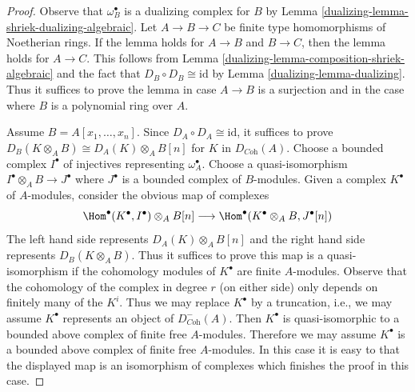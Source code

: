 \begin{proof}

Observe that $\omega_B^\bullet$ is a dualizing complex for $B$ by
Lemma \ref{dualizing-lemma-shriek-dualizing-algebraic}.
Let $A \to B \to C$ be finite type homomorphisms of Noetherian rings.
If the lemma holds for $A \to B$ and $B \to C$, then the lemma holds for
$A \to C$. This follows from
Lemma \ref{dualizing-lemma-composition-shriek-algebraic}
and the fact that $D_B \circ D_B \cong \text{id}$ by
Lemma \ref{dualizing-lemma-dualizing}.
Thus it suffices to prove the lemma in case $A \to B$ is
a surjection and in the case where $B$ is a
polynomial ring over $A$.

\medskip\noindent
Assume $B = A[x_1, \ldots, x_n]$. Since $D_A \circ D_A \cong \text{id}$,
it suffices to prove
$D_B(K \otimes_A B) \cong D_A(K) \otimes_A B[n]$ for $K$
in $D_{\textit{Coh}}(A)$.
Choose a bounded complex $I^\bullet$ of injectives representing
$\omega_A^\bullet$. Choose a quasi-isomorphism
$I^\bullet \otimes_A B \to J^\bullet$ where $J^\bullet$
is a bounded complex of $B$-modules. Given a complex
$K^\bullet$ of $A$-modules, consider the obvious
map of complexes
$$
\Hom^\bullet(K^\bullet, I^\bullet) \otimes_A B[n]
\longrightarrow
\Hom^\bullet(K^\bullet \otimes_A B, J^\bullet[n])
$$
The left hand side represents $D_A(K) \otimes_A B[n]$ and the right hand
side represents $D_B(K \otimes_A B)$. Thus it suffices to prove this
map is a quasi-isomorphism if the cohomology modules
of $K^\bullet$ are finite $A$-modules. Observe that the
cohomology of the complex in degree $r$ (on either side)
only depends on finitely many of the $K^i$. Thus we may
replace $K^\bullet$ by a truncation, i.e., we may assume
$K^\bullet$ represents an object of $D^-_{\textit{Coh}}(A)$.
Then $K^\bullet$ is quasi-isomorphic to a bounded
above complex of finite free $A$-modules.
Therefore we may assume $K^\bullet$ is a bounded
above complex of finite free $A$-modules.
In this case it is easy to that the
displayed map is an isomorphism of complexes which finishes
the proof in this case.


\end{proof}
